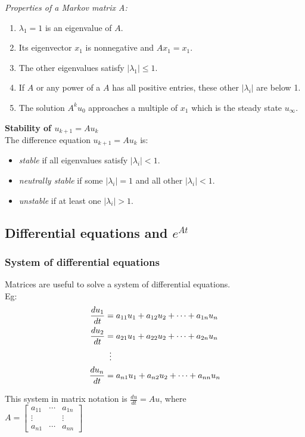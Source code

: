 \textit{Properties of a Markov matrix A:}\\
\begin{enumerate}
\item $\lambda_1= 1$ is an eigenvalue of $A$.
\item Its eigenvector $x_1$ is nonnegative and $Ax_1 = x_1$.
\item The other eigenvalues satisfy $|\lambda_1| \leq 1$.
\item If $A$ or any power of a $A$ has all positive entries, these other $|\lambda_i|$ are below 1. 
\item The solution $A^ku_0$ approaches a multiple of $x_1$ which is the steady state $u_{\infty}$.
\end{enumerate}




\textbf{Stability of $u_{k+1} = Au_k$}\\

The difference equation $u_{k+1} = Au_k$ is:\\
\begin{itemize}
\item \textit{stable} if all eigenvalues satisfy $|\lambda_i| < 1$.
\item \textit{neutrally stable} if some $|\lambda_i| = 1$ and all other $|\lambda_i| < 1$.
\item \textit{unstable} if at least one $|\lambda_i| > 1$.
\end{itemize}


\subsection{Differential equations and $e^{At}$}
\subsubsection{System of differential equations}
Matrices are useful to solve a system of differential equations.\\
Eg:
\begin{align*}
\frac{du_1}{dt} &= a_{11}u_1 + a_{12}u_2 + \cdots + a_{1n}u_n\\
\frac{du_2}{dt} &= a_{21}u_1 + a_{22}u_2 + \cdots + a_{2n}u_n\\
&\vdotswithin{=}\\
\frac{du_n}{dt} &= a_{n1}u_1 + a_{n2}u_2 + \cdots + a_{nn}u_n\\
\end{align*}

This system in matrix notation is $\frac{du}{dt} = Au$, where\\
$A = 
\begin{bmatrix}
a_{11} & \cdots & a_{1n}\\
\vdots & & \vdots\\
a_{n1} & \cdots & a_{nn}	
\end{bmatrix}
$

